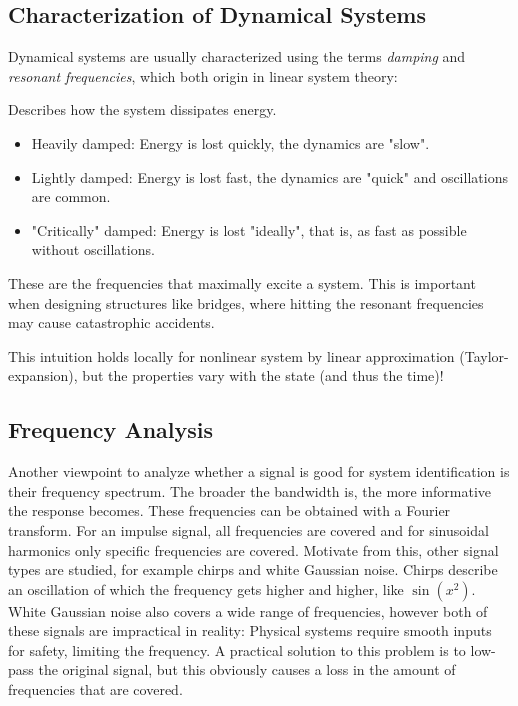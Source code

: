 		\subsection{Characterization of Dynamical Systems}
			Dynamical systems are usually characterized using the terms \emph{damping} and \emph{resonant frequencies}, which both origin in linear system theory:
			\begin{description}[leftmargin=5cm]
				\item[Damping] Describes how the system dissipates energy.
					\begin{itemize}
						\item Heavily damped: Energy is lost quickly, the dynamics are "slow".
						\item Lightly damped: Energy is lost fast, the dynamics are "quick" and oscillations are common.
						\item "Critically" damped: Energy is lost "ideally", that is, as fast as possible without oscillations.
					\end{itemize}
				\item[Resonant Frequencies] These are the frequencies that maximally excite a system. This is important when designing structures like bridges, where hitting the resonant frequencies may cause catastrophic accidents.
			\end{description}
			This intuition holds locally for nonlinear system by linear approximation (Taylor-expansion), but the properties vary with the state (and thus the time)!

		\subsection{Frequency Analysis}
			Another viewpoint to analyze whether a signal is good for system identification is their frequency spectrum. The broader the bandwidth is, the more informative the response becomes. These frequencies can be obtained with a Fourier transform. For an impulse signal, all frequencies are covered and for sinusoidal harmonics only specific frequencies are covered. Motivate from this, other signal types are studied, for example chirps and white Gaussian noise. Chirps describe an oscillation of which the frequency gets higher and higher, like \( \sin(x^2) \). White Gaussian noise also covers a wide range of frequencies, however both of these signals are impractical in reality: Physical systems require smooth inputs for safety, limiting the frequency. A practical solution to this problem is to low-pass the original signal, but this obviously causes a loss in the amount of frequencies that are covered.

